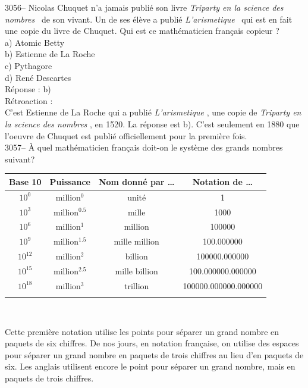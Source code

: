 \documentclass[letterpaper, 12pt]{article}
\begin{document}
3056-- Nicolas Chuquet n'a jamais publi\'e son livre \og \emph{Triparty en la science des nombres} \fg \ de son vivant. Un de ses \'el\`eve a publi\'e \og \emph{L'arismetique} \fg \ qui est en fait une copie du livre de Chuquet. Qui est ce math\'ematicien fran\c cais \og copieur \fg ?\\

a) Atomic Betty\\
b) Estienne de La Roche\\
c) Pythagore\\
d) Ren\'e Descartes\\

R\'eponse : b)\\

R\'etroaction :\\
C'est Estienne de La Roche qui a publi\'e \og \emph{L'arismetique} \fg, une copie de \og \emph{Triparty en la science des nombres} \fg, en 1520. La r\'eponse est b). C'est seulement en 1880 que l'oeuvre de Chuquet est publi\'e officiellement pour la premi\`ere fois.\\



3057-- \`A quel math\'ematicien fran\c cais doit-on le syst\`eme des grands nombres suivant?\\
\begin{center}
\begin{tabular}{|c|c|c|c|} \hline
{\bf Base 10} & {\bf Puissance} & {\bf Nom donn\'e par \dots} & {\bf Notation de \dots} \\ \hline \hline
$10^{0}$ & million$^{0}$ & unit\'e & 1\\[1mm] \hline
$10^{3}$ & million$^{0.5}$ & mille & 1000\\[1mm] \hline
$10^{6}$ & million$^{1}$ & million & 100000\\[1mm] \hline
$10^{9}$ & million$^{1.5}$ & mille million & 100.000000\\[1mm] \hline
$10^{12}$ & million$^{2}$ & billion & 100000.000000\\[1mm] \hline
$10^{15}$ & million$^{2.5}$ & mille billion & 100.000000.000000\\[1mm] \hline
$10^{18}$ & million$^{3}$ & trillion & 100000.000000.000000\\[1mm] \hline
\multicolumn{4}{c}{}\\
\end{tabular}\\
\end{center}
Cette premi\`ere notation utilise les points pour s\'eparer un grand nombre en paquets de six chiffres. De nos jours, en notation fran\c caise, on utilise des espaces pour s\'eparer un grand nombre en paquets de trois chiffres au lieu d'en paquets de six. Les anglais utilisent encore le point pour s\'eparer un grand nombre, mais en paquets de trois chiffres.\\
\end{document}
